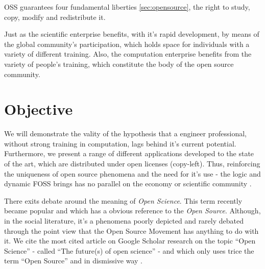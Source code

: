 \documentclass[
12pt,				%
openright,			%
oneside,			%
a4paper,			%
brazil,				%
english,			%
]{abntex2}
\begin{document}
OSS guarantees four fundamental liberties \autoref{sec:opensource}, the right to study, copy, modify and redistribute it.

Just as the scientific enterprise benefits, with it's rapid development, by means of the global community's participation, which holds space for individuals with a variety of different training. Also, the computation enterprise benefits from the variety of people's training, which constitute the body of the open source community.
\section{Objective}

We will demonstrate the vality of the hypothesis that a engineer
professional, without strong training in computation, lags behind it's
current potential. Furthermore, we present a range of different
applications developed to the state of the art, which are distributed
under open licenses (copy-left). Thus, reinforcing the uniqueness of
open source phenomena and the need for it's use - the logic and
dynamic FOSS brings has no parallel on the economy or scientific
community \cite{hippel2003open,peters2009open}.

There exits debate around the meaning of \textit{Open Science}. This
term recently became popular and which has a obvious reference to the
\textit{Open Source}. Although, in the social literature, it's a phenomena
poorly depicted and rarely debated through the point view that the Open
Source Movement has anything to do with it. We cite the most cited
article on Google Scholar research on the topic ``Open Science'' -
called ``The future(s) of open science'' - and which only uses trice
the term ``Open Source'' and in dismissive way
\cite{mirowski2018future}.
\end{document}
